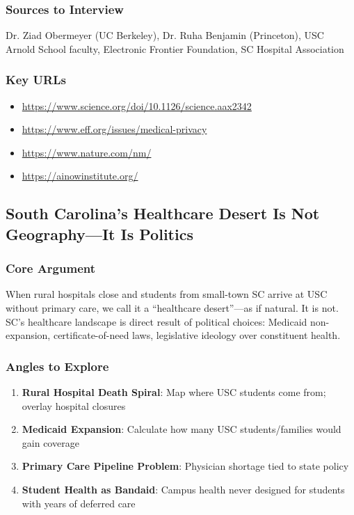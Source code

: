 \documentclass[11pt,letterpaper]{article}
\begin{document}
\subsubsection*{Sources to Interview}
Dr. Ziad Obermeyer (UC Berkeley), Dr. Ruha Benjamin (Princeton), USC Arnold School faculty, Electronic Frontier Foundation, SC Hospital Association

\subsubsection*{Key URLs}
\begin{itemize}[noitemsep]
    \item \url{https://www.science.org/doi/10.1126/science.aax2342}
    \item \url{https://www.eff.org/issues/medical-privacy}
    \item \url{https://www.nature.com/nm/}
    \item \url{https://ainowinstitute.org/}
\end{itemize}

\newpage
\subsection{South Carolina's Healthcare Desert Is Not Geography---It Is Politics}

\subsubsection*{Core Argument}
When rural hospitals close and students from small-town SC arrive at USC without primary care, we call it a ``healthcare desert''---as if natural. It is not. SC's healthcare landscape is direct result of political choices: Medicaid non-expansion, certificate-of-need laws, legislative ideology over constituent health.

\subsubsection*{Angles to Explore}
\begin{enumerate}[noitemsep]
    \item \textbf{Rural Hospital Death Spiral}: Map where USC students come from; overlay hospital closures
    \item \textbf{Medicaid Expansion}: Calculate how many USC students/families would gain coverage
    \item \textbf{Primary Care Pipeline Problem}: Physician shortage tied to state policy
    \item \textbf{Student Health as Bandaid}: Campus health never designed for students with years of deferred care
\end{enumerate}
\end{document}

